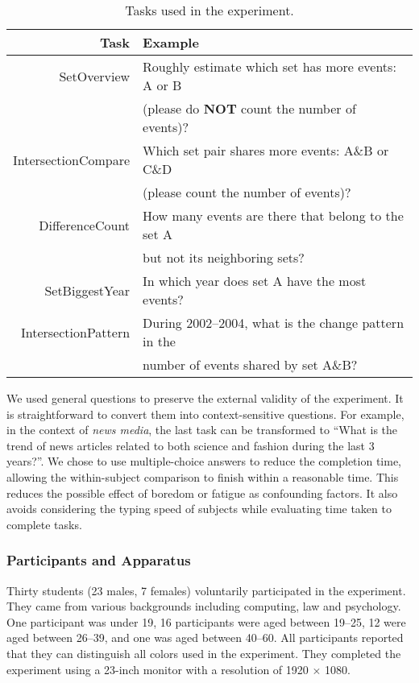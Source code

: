 \begin{table}[!htb]
\centering
\sffamily\small
\caption{Tasks used in the experiment.}
\label{table:tasks}
\begin{tabular}{rl}
	\toprule
	\textbf{Task} & \textbf{Example} \\
	\midrule
	SetOverview & Roughly estimate which set has more events:  A or B \\&(please do \textbf{NOT} count the number of events)? \\
 	IntersectionCompare & Which set pair shares more events: A\&B or C\&D\\&  (please count the number of events)? \\
 	DifferenceCount & How many events are there that belong to the set A \\&but not its neighboring sets? \\
 	SetBiggestYear & In which year does set A have the most events? \\
 	IntersectionPattern & During 2002--2004, what is the change pattern in the \\& number of  events shared by set A\&B?\\
	\bottomrule
\end{tabular}
\end{table}


We used general questions to preserve the external validity of the experiment. It is straightforward to convert them into context-sensitive questions. For example, in the context of \textit{news media}, the last task can be transformed to ``What is the trend of news articles related to both science and fashion during the last 3 years?''. We chose to use multiple-choice answers to reduce the completion time, allowing the within-subject comparison to finish within a reasonable time. This reduces the possible effect of boredom or fatigue as confounding factors. It also avoids considering the typing speed of subjects while evaluating time taken to complete tasks.

\subsubsection{Participants and Apparatus} Thirty students (23 males, 7 females) voluntarily participated in the experiment. They came from various backgrounds including computing, law and psychology. One participant was under 19, 16 participants were aged between 19--25, 12 were aged between 26--39, and one was aged between 40--60. All participants reported that they can distinguish all colors used in the experiment. They completed the experiment using a 23-inch monitor with a resolution of 1920 $\times$ 1080.

